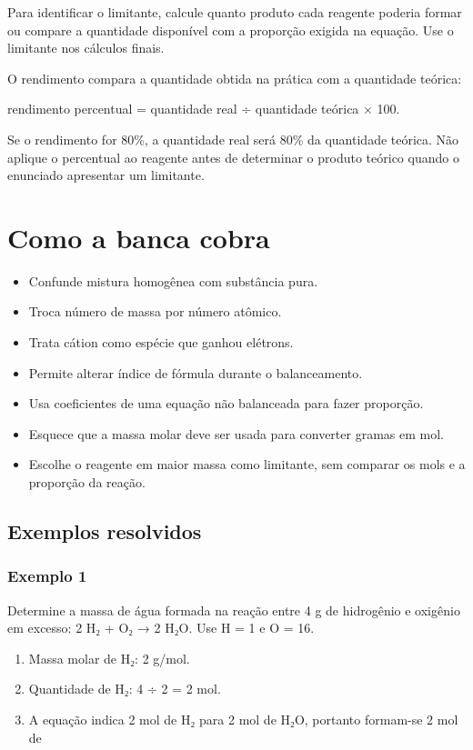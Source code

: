\documentclass[11pt,a4paper]{article}
\begin{document}
Para identificar o limitante, calcule quanto produto cada reagente poderia formar ou compare a quantidade disponível com a proporção exigida na equação. Use o limitante nos cálculos finais.

O rendimento compara a quantidade obtida na prática com a quantidade teórica:

rendimento percentual = quantidade real ÷ quantidade teórica × 100.

Se o rendimento for 80\%, a quantidade real será 80\% da quantidade teórica. Não aplique o percentual ao reagente antes de determinar o produto teórico quando o enunciado apresentar um limitante.

\section*{Como a banca cobra}

\begin{itemize}
  \item Confunde mistura homogênea com substância pura.
  \item Troca número de massa por número atômico.
  \item Trata cátion como espécie que ganhou elétrons.
  \item Permite alterar índice de fórmula durante o balanceamento.
  \item Usa coeficientes de uma equação não balanceada para fazer proporção.
  \item Esquece que a massa molar deve ser usada para converter gramas em mol.
  \item Escolhe o reagente em maior massa como limitante, sem comparar os mols e a proporção da reação.
\end{itemize}

\subsection*{Exemplos resolvidos}

\subsubsection*{Exemplo 1}

Determine a massa de água formada na reação entre 4 g de hidrogênio e oxigênio em excesso: 2 H₂ + O₂ → 2 H₂O. Use H = 1 e O = 16.

\begin{enumerate}
  \item Massa molar de H₂: 2 g/mol.
  \item Quantidade de H₂: 4 ÷ 2 = 2 mol.
  \item A equação indica 2 mol de H₂ para 2 mol de H₂O, portanto formam-se 2 mol de
\end{enumerate}
\end{document}
